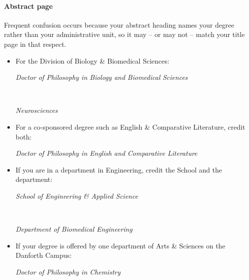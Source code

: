 \paragraph{Abstract page}
Frequent confusion occurs because your abstract heading names your degree rather than your administrative unit, so it may – or may not – match your title page in that respect.

\begin{itemize}
\item For the Division of Biology \& Biomedical Sciences: \\
\centerline{\emph{Doctor of Philosophy in Biology and Biomedical Sciences}}\\
\centerline{\emph{Neurosciences}}

\item For a co-sponsored degree such as English \& Comparative Literature, credit both: \\
\centerline{\emph{Doctor of Philosophy in English and Comparative Literature}}

\item If you are in a department in Engineering, credit the School and the department: \\
\centerline{\emph{School of Engineering \& Applied Science}}\\
\centerline{\emph{Department of Biomedical Engineering}}

\item If your degree is offered by one department of Arts \& Sciences on the Danforth Campus: \\
\centerline{\emph{Doctor of Philosophy in Chemistry}}
\end{itemize}
